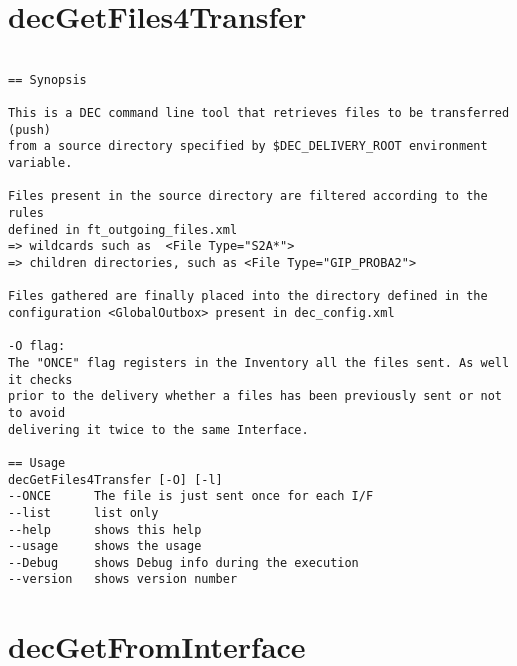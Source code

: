 \documentclass[dec_sum_main.tex]{subfiles}
\begin{document}
\label{decGetFiles4Transfer}
\section{decGetFiles4Transfer}

\begin{verbatim}

== Synopsis

This is a DEC command line tool that retrieves files to be transferred (push)
from a source directory specified by $DEC_DELIVERY_ROOT environment variable.

Files present in the source directory are filtered according to the rules 
defined in ft_outgoing_files.xml
=> wildcards such as  <File Type="S2A*">
=> children directories, such as <File Type="GIP_PROBA2"> 

Files gathered are finally placed into the directory defined in the 
configuration <GlobalOutbox> present in dec_config.xml 

-O flag:
The "ONCE" flag registers in the Inventory all the files sent. As well it checks
prior to the delivery whether a files has been previously sent or not to avoid 
delivering it twice to the same Interface.

== Usage
decGetFiles4Transfer [-O] [-l]
--ONCE      The file is just sent once for each I/F
--list      list only
--help      shows this help
--usage     shows the usage
--Debug     shows Debug info during the execution
--version   shows version number

\end{verbatim}

\section{decGetFromInterface}
\end{document}
